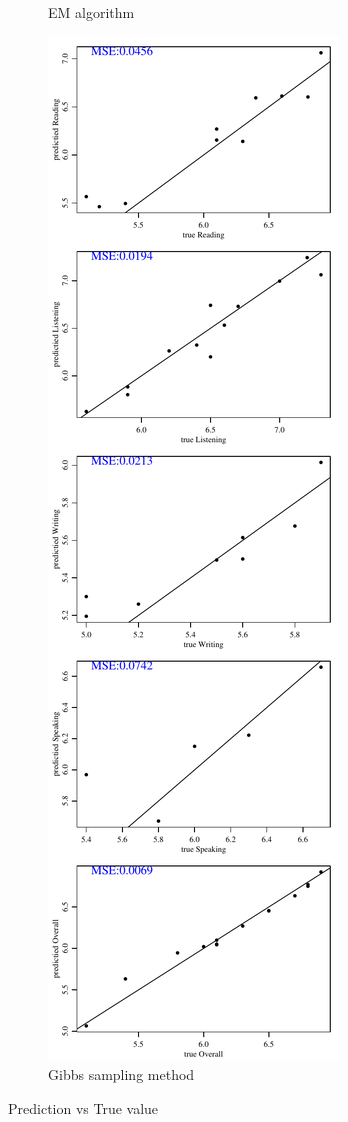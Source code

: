 \documentclass[12pt]{article}
\begin{document}
\begin{figure}[h!]
\begin{subfigure}{0.4\textwidth}
    \caption{EM algorithm}
    \label{fig:0.25-empvt}
\end{subfigure}
\begin{subfigure}{0.4\textwidth}
    \includegraphics[height=.85\textheight]{pic/0.25/Gibbs_PredvsTrue.pdf}
    \caption{Gibbs sampling method}
    \label{fig:0.25-gibbspvt}
\end{subfigure}
        
\caption{Prediction vs True value}
\label{fig:0.25-pvt}
\end{figure}
\end{document}
